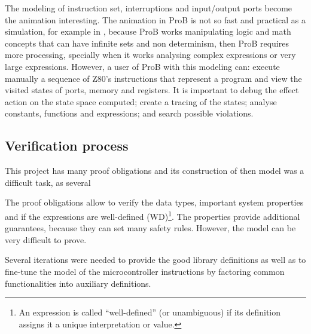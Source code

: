 \documentclass[a4paper]{llncs}
\begin{document}
The modeling of instruction set, interruptions and input/output ports become the
animation interesting. The animation in ProB is not so fast and practical as a
simulation, for example in \cite{Simulator_z80}, because ProB works manipulating
logic and math concepts that can have infinite sets and non determinism, then
ProB requires more processing, specially when it works analysing  complex
expressions or very large expressions. However, a user of ProB with this modeling
can: execute manually a sequence of Z80's instructions that represent a program
and view the visited states of ports, memory and registers. It is important to
debug the effect action on the state space computed; create a tracing of the
states; analyse constants, functions and expressions; and search possible
violations.

\subsection{Verification process}%

This project has many proof obligations and its construction of then model was a difficult task, as several
 
 


The proof obligations allow to verify the data types, important system
properties and if the expressions are well-defined (WD)\footnote{An
  expression is called ``well-defined'' (or unambiguous) if its
  definition assigns it a unique interpretation or value.}. The
properties provide additional guarantees, because they can set many
safety rules. However, the model can be very difficult to prove.

Several iterations were needed to provide the good library definitions as well as
to fine-tune the model of the microcontroller instructions by factoring common
functionalities into auxiliary definitions. 
 

\end{document}

